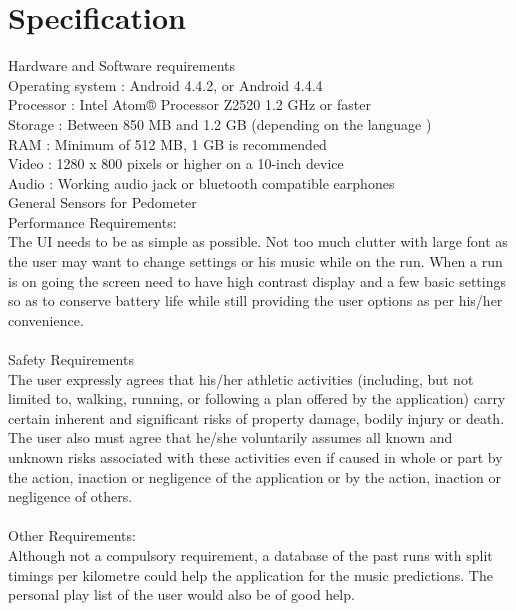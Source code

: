 \documentclass[10pt, a4paper]{article}
\begin{document}
\section*{Specification}
Hardware and Software requirements \\
Operating system : Android 4.4.2, or Android 4.4.4\\
Processor : Intel Atom® Processor Z2520 1.2 GHz or faster\\
Storage : Between 850 MB and 1.2 GB (depending on the language )\\
RAM : Minimum of 512 MB, 1 GB is recommended\\
Video : 1280 x 800 pixels or higher on a 10-inch device\\
Audio :  Working audio jack or bluetooth compatible earphones\\
General Sensors for Pedometer \\
Performance Requirements: \\
The UI needs to be as simple as possible. Not too much clutter with large font as the user may want to change settings or his music while on the run. When a run is on going the screen need to have high contrast display and a few basic settings so as to conserve battery life while still providing the user options as per his/her convenience.\\ \\
Safety Requirements \\
The user expressly agrees that his/her athletic activities (including, but not limited to, walking, running, or following a plan offered by the application) carry certain inherent and significant risks of property damage, bodily injury or death. The user also must agree that he/she voluntarily assumes all known and unknown risks associated with these activities even if caused in whole or part by the action, inaction or negligence of the application or by the action, inaction or negligence of others.\\ \\
Other Requirements: \\
Although not a compulsory requirement, a database of the past runs with split timings per kilometre could help the application for the music predictions. The personal play list of the user would also be of good help.\\ 
\end{document}
